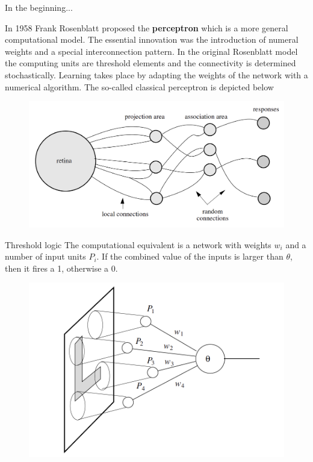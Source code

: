 \documentclass[11pt, aspectratio=43]{beamer}
\begin{document}
\begin{frame}{In the beginning... }
	
	In 1958 Frank Rosenblatt proposed the \textbf{perceptron} which is a more general computational model. The essential innovation was the introduction of numeral weights and a special interconnection pattern. In the original Rosenblatt model the computing units are threshold elements and the connectivity is determined stochastically. Learning takes place by adapting the weights of the network with a numerical algorithm. The so-called classical perceptron is depicted below
	
			\begin{figure}[h]
		\centering
		\includegraphics[scale=0.4]{Figures/nn_3.1.png}
	\end{figure}	
	
	
\end{frame}

\begin{frame}{Threshold logic}
	The computational equivalent is a network with weights $w_i$ and a number of input units $P_i$. If the combined value of the inputs is larger than $\theta$, then it fires a 1, otherwise a 0.

			\begin{figure}[h]
	\centering
	\includegraphics[scale=0.4]{Figures/nn_3.2.png}
\end{figure}	
	
	
\end{frame}
\end{document}
